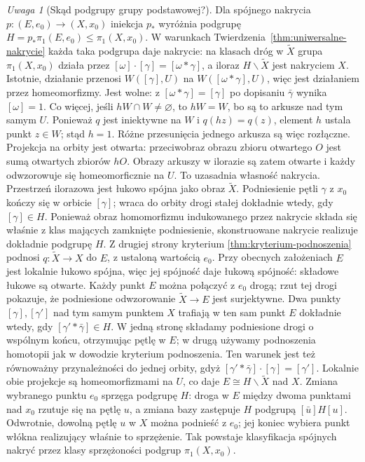 \documentclass[11pt,a4paper,oneside]{report}
\theoremstyle{plain}
\theoremstyle{definition}
\theoremstyle{remark}
\newtheorem{uwaga}[twierdzenie]{Uwaga}
\begin{document}
\begin{uwaga}[Skąd podgrupy grupy podstawowej?]
\label{uwaga:nakrycia-podgrupy}
Dla spójnego nakrycia $p:(E,e_0)\to(X,x_0)$
iniekcja $p_*$ wyróżnia podgrupę
$H=p_*\pi_1(E,e_0)\leq\pi_1(X,x_0)$.
W warunkach Twierdzenia~\ref{thm:uniwersalne-nakrycie}
każda taka podgrupa daje nakrycie:
na klasach dróg w $\widetilde X$ grupa
$\pi_1(X,x_0)$ działa przez
$[\omega]\cdot[\gamma]=[\omega*\gamma]$,
a iloraz $H\backslash\widetilde X$
jest nakryciem $X$. Istotnie, działanie przenosi
$W([\gamma],U)$ na $W([\omega*\gamma],U)$,
więc jest działaniem przez homeomorfizmy. Jest wolne:
z $[\omega*\gamma]=[\gamma]$ po dopisaniu $\bar\gamma$
wynika $[\omega]=1$.
Co więcej, jeśli $hW\cap W\ne\varnothing$, to $hW=W$,
bo są to arkusze nad tym samym $U$. Ponieważ $q$ jest
iniektywne na $W$ i $q(hz)=q(z)$, element $h$ ustala punkt $z\in W$;
stąd $h=1$. Różne przesunięcia jednego arkusza są więc rozłączne.
Projekcja na orbity jest otwarta: przeciwobraz obrazu zbioru
otwartego $O$ jest sumą otwartych zbiorów $hO$.
Obrazy arkuszy w ilorazie są zatem otwarte i każdy odwzorowuje się
homeomorficznie na $U$. To uzasadnia własność nakrycia.
Przestrzeń ilorazowa jest łukowo spójna jako obraz $\widetilde X$.
Podniesienie pętli $\gamma$ z $x_0$ kończy się w orbicie $[\gamma]$;
wraca do orbity drogi stałej dokładnie wtedy, gdy $[\gamma]\in H$.
Ponieważ obraz homomorfizmu indukowanego przez nakrycie składa się
właśnie z klas mających zamknięte podniesienie, skonstruowane nakrycie
realizuje dokładnie podgrupę $H$.
Z drugiej strony kryterium
\ref{thm:kryterium-podnoszenia} podnosi
$q:\widetilde X\to X$ do $E$, z ustaloną wartością $e_0$.
Przy obecnych założeniach $E$ jest lokalnie łukowo spójna,
więc jej spójność daje łukową spójność: składowe łukowe są otwarte.
Każdy punkt $E$ można połączyć z $e_0$ drogą; rzut tej drogi
pokazuje, że podniesione odwzorowanie $\widetilde X\to E$ jest surjektywne.
Dwa punkty $[\gamma],[\gamma']$ nad tym samym punktem $X$
trafiają w ten sam punkt $E$
dokładnie wtedy, gdy $[\gamma'*\bar\gamma]\in H$.
W jedną stronę składamy podniesione drogi o wspólnym końcu,
otrzymując pętlę w $E$; w drugą używamy podnoszenia homotopii
jak w dowodzie kryterium podnoszenia. Ten warunek jest też
równoważny przynależności do jednej orbity, gdyż
$[\gamma'*\bar\gamma]\cdot[\gamma]=[\gamma']$.
Lokalnie obie projekcje są
homeomorfizmami na $U$, co daje
$E\cong H\backslash\widetilde X$
nad $X$. Zmiana wybranego punktu
$e_0$ sprzęga podgrupę $H$: droga w $E$ między dwoma punktami
nad $x_0$ rzutuje się na pętlę $u$, a zmiana bazy zastępuje
$H$ podgrupą $[\bar u]H[u]$.
Odwrotnie, dowolną pętlę $u$ w $X$ można podnieść z $e_0$;
jej koniec wybiera punkt włókna realizujący właśnie to sprzężenie.
Tak powstaje klasyfikacja spójnych
nakryć przez klasy sprzężoności
podgrup $\pi_1(X,x_0)$.
\end{uwaga}
\end{document}
